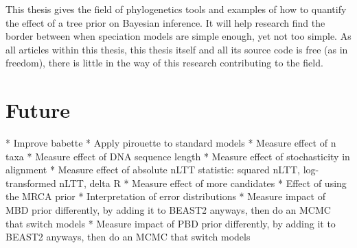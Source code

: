 This thesis gives the field of phylogenetics tools and examples of
how to quantify the effect of a tree prior on Bayesian inference.
It will help research find the border between when speciation models are
simple enough, yet not too simple. As all articles within this thesis,
this thesis itself and all its source code is free (as in freedom),
there is little in the way of this research contributing to the field. 


\section{Future}

 * Improve babette
 * Apply pirouette to standard models
   * Measure effect of n taxa
   * Measure effect of DNA sequence length
   * Measure effect of stochasticity in alignment
   * Measure effect of absolute nLTT statistic: squared nLTT, 
     log-transformed nLTT, delta R 
   * Measure effect of more candidates
   * Effect of using the MRCA prior
   * Interpretation of error distributions 
 * Measure impact of MBD prior differently, by adding it to BEAST2
   anyways, then do an MCMC that switch models
 * Measure impact of PBD prior differently, by adding it to BEAST2
   anyways, then do an MCMC that switch models




